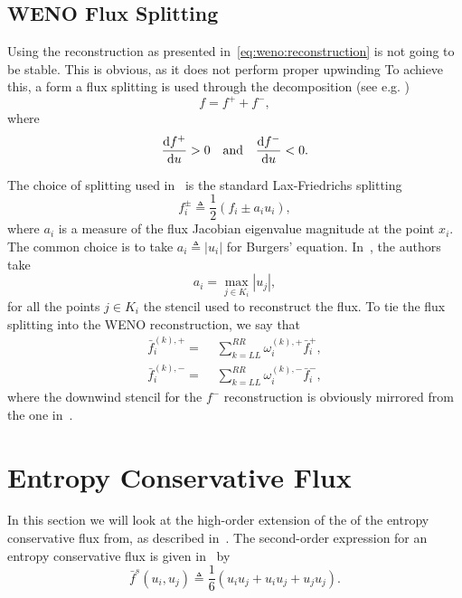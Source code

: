 \documentclass{scrartcl}
\begin{document}

\subsection{WENO Flux Splitting} %
\label{ssc:weno:flux}

Using the reconstruction as presented in~\eqref{eq:weno:reconstruction} is
not going to be stable. This is obvious, as it does not perform proper upwinding
To achieve this, a form a flux splitting is used through the decomposition
(see e.g. \cite{Fisher2012})
\[
f = f^+ + f^-,
\]
where
\[
\dfrac{\mathrm{d} f^+}{\mathrm{d} u} > 0
\quad \text{and} \quad
\dfrac{\mathrm{d} f^-}{\mathrm{d} u} < 0.
\]

The choice of splitting used in~\cite{Fisher2012} is the standard Lax-Friedrichs
splitting
\[
f^\pm_i \triangleq \frac{1}{2} (f_i \pm a_i u_i),
\]
where $a_i$ is a measure of the flux Jacobian eigenvalue magnitude at the point
$x_i$. The common choice is to take $a_i \triangleq |u_i|$ for Burgers' equation. In~\cite{Fisher2012}, the authors take
\[
a_i = \max_{j \in K_i} |u_j|,
\]
for all the points $j \in K_i$ the stencil used to reconstruct the flux. To
tie the flux splitting into the WENO reconstruction, we say that
\[
\begin{aligned}
\bar{f}^{(k), +}_i =\,\, & \sum_{k = LL}^{RR} \omega^{(k), +}_i \bar{f}^+_i, \\
\bar{f}^{(k), -}_i =\,\, & \sum_{k = LL}^{RR} \omega^{(k), -}_i \bar{f}^-_i,
\end{aligned}
\]
where the downwind stencil for the $f^-$ reconstruction is obviously mirrored
from the one in~.



\section{Entropy Conservative Flux} %
\label{sc:entropy}

In this section we will look at the high-order extension of the of the entropy
conservative flux from, as described in~\cite{Fisher2013}. The second-order
expression for an entropy conservative flux is given in~ by
\[
\bar{f}^s(u_i, u_j) \triangleq
    \frac{1}{6} (u_i u_j + u_i u_j + u_j u_j).
\]
\end{document}
